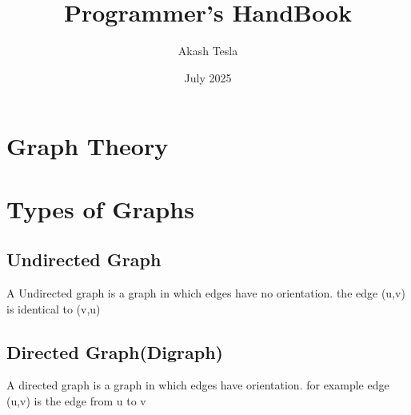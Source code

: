 \documentclass[12pt]{extarticle}
\title{Programmer's HandBook}
\author{Akash Tesla}
\date{July 2025}
\begin{document}
\tableofcontents
\newpage
\maketitle

\section*{Graph Theory}
\section{Types of Graphs}
\subsection{Undirected Graph}
A Undirected graph is a graph in which edges have no orientation. the edge (u,v) is identical
to (v,u)

\subsection{Directed Graph(Digraph)}
A directed graph is a graph in which edges have orientation. for example edge (u,v) is the edge
from u to v
\end{document}
